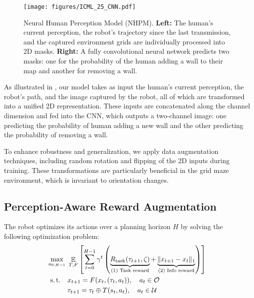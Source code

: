 \begin{figure}[t]
    \centering
    \texttt{[image: figures/ICML\_25\_CNN.pdf]}
    \caption{Neural Human Perception Model (NHPM). \textbf{Left:} The human's current perception, the robot's trajectory since the last transmission, and the captured environment grids are individually processed into 2D masks. \textbf{Right:} A fully convolutional neural network predicts two masks: one for the probability of the human adding a wall to their map and another for removing a wall.}
    \label{fig:nhpm}
    \vskip -0.1in
\end{figure}

As illustrated in , our model takes as input the human’s current perception, the robot’s path, and the image captured by the robot, all of which are transformed into a unified 2D representation. These inputs are concatenated along the channel dimension and fed into the CNN, which outputs a two-channel image: one predicting the probability of human adding a new wall and the other predicting the probability of removing a wall.


To enhance robustness and generalization, we apply data augmentation techniques, including random rotation and flipping of the 2D inputs during training. These transformations are particularly beneficial in the grid maze environment, which is invariant to orientation changes.

\subsection{Perception-Aware Reward Augmentation}
The robot optimizes its actions over a planning horizon \( H \) by solving the following optimization problem:
\begin{subequations}
    \begin{align}
        \max_{a_{0:H-1}} \;
        & \mathop{\mathbb{E}}_{T, F} \left[ \sum_{t=0}^{H-1} \gamma^t \left(\underbrace{R_{\mathrm{task}}(\tau_{t+1}, \zeta)}_{\text{(1) Task reward}} + \underbrace{\|x_{t+1}-x_t\|_1}_{\text{(2) Info reward}}\right)\right] \label{obj}\\ 
        \operatorname{s.t.} \quad
        &x_{t+1} = F(x_t, (\tau_t, a_t)), \quad a_t\in\mathcal{O} \label{const:perception_update}\\ 
        &\tau_{t+1} = \tau_t \oplus T(s_t, a_t), \quad a_t\in \mathcal{U}\label{const:history_update}
    \end{align}
\end{subequations} 

